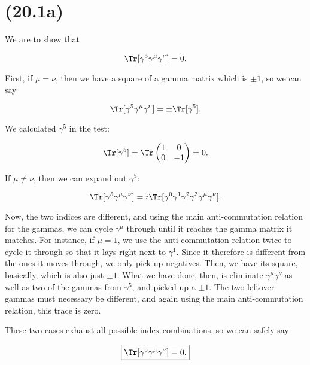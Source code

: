 \section{(20.1a)}


We are to show that

\begin{equation}
    \Tr[\gamma^{5}\gamma^{\mu}\gamma^{\nu}] = 0.
\end{equation}

First, if $\mu=\nu$, then we have a square of a gamma matrix which is $\pm 1$, so we can say

\begin{equation*}
    \Tr[\gamma^{5}\gamma^{\mu}\gamma^{\nu}] = \pm\Tr[\gamma^5].
\end{equation*}

We calculated $\gamma^5$ in the test:

\begin{equation*}
    \Tr[\gamma^5] = \Tr\begin{pmatrix}1 & 0 \\ 0 & -1\end{pmatrix} = 0.
\end{equation*}

If $\mu\neq\nu$, then we can expand out $\gamma^5$:

\begin{equation*}
    \Tr[\gamma^{5}\gamma^{\mu}\gamma^{\nu}] = i\Tr[\gamma^0\gamma^1\gamma^2\gamma^3\gamma^{\mu}\gamma^{\nu}].
\end{equation*}

Now, the two indices are different, and using the main anti-commutation relation for the gammas, we can cycle $\gamma^{\mu}$ through until it reaches the gamma matrix it matches. For instance, if $\mu=1$, we use the anti-commutation relation twice to cycle it through so that it lays right next to $\gamma^1$. Since it therefore is different from the ones it moves through, we only pick up negatives. Then, we have its square, basically, which is also just $\pm 1$. What we have done, then, is eliminate $\gamma^{\mu}\gamma^{\nu}$ as well as two of the gammas from $\gamma^5$, and picked up a $\pm1$. The two leftover gammas must necessary be different, and again using the main anti-commutation relation, this trace is zero.

These two cases exhaust all possible index combinations, so we can safely say

\begin{equation*}
    \boxed{\Tr[\gamma^{5}\gamma^{\mu}\gamma^{\nu}] = 0.}
\end{equation*}